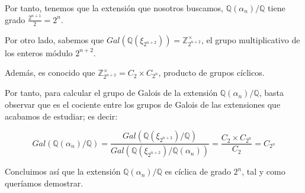 \documentclass[a4paper, 11pt]{article}
\begin{document}
\begin{solucion}
      Por tanto, tenemos que la extensión que nosotros buscamos, $\mathbb{Q}(\alpha_n)/\mathbb{Q}$ tiene grado $\frac{2^{n+1}}{2} = 2^n$.

      Por otro lado, sabemos que $Gal(\mathbb{Q}(\xi_{2^{n+2}})) = \mathbb{Z}_{2^{n+2}}^\times$, el grupo multiplicativo de los enteros módulo $2^{n+2}$.

      Además, es conocido que $\mathbb{Z}_{2^{n+2}}^\times = C_2 \times C_{2^n}$, producto de grupos cíclicos.

      Por tanto, para calcular el grupo de Galois de la extensión $\mathbb{Q}(\alpha_n)/\mathbb{Q}$, basta observar que es el cociente entre los grupos de Galois de las extensiones que acabamos de estudiar; es decir:

      \[
      Gal(\mathbb{Q}(\alpha_n)/\mathbb{Q}) =  \frac{Gal(\mathbb{Q}(\xi_{2^{n+2}})/\mathbb{Q})}{Gal(\mathbb{Q}(\xi_{2^{n+2}})/\mathbb{Q}(\alpha_n))} = \frac{C_2 \times C_{2^n}}{C_2} = C_{2^n}
      \]

      Concluimos así que la extensión $\mathbb{Q}(\alpha_n)/\mathbb{Q}$ es cíclica de grado $2^n$, tal y como queríamos demostrar.
    \end{solucion}
\end{document}
